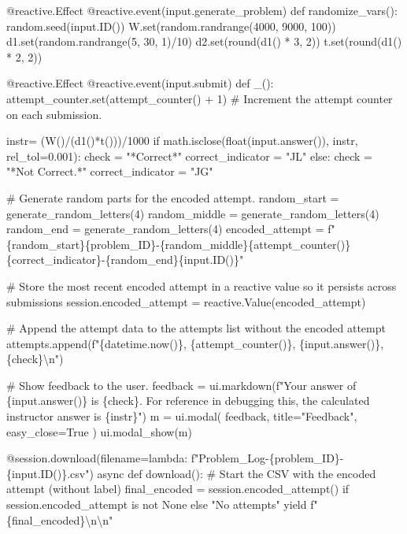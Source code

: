 \documentclass[
  letterpaper,
  DIV=11,
  numbers=noendperiod]{scrreprt}
\newenvironment{Shaded}{\begin{snugshade}}{\end{snugshade}}
\newcommand{\NormalTok}[1]{\textcolor[rgb]{0.00,0.23,0.31}{#1}}
\begin{document}
\begin{Shaded}
\begin{Highlighting}[]
\NormalTok{    @reactive.Effect}
\NormalTok{    @reactive.event(input.generate\_problem)}
\NormalTok{    def randomize\_vars():}
\NormalTok{        random.seed(input.ID())}
\NormalTok{        W.set(random.randrange(4000, 9000, 100))}
\NormalTok{        d1.set(random.randrange(5, 30, 1)/10)}
\NormalTok{        d2.set(round(d1() * 3, 2))}
\NormalTok{        t.set(round(d1() * 2, 2))}

\NormalTok{    @reactive.Effect}
\NormalTok{    @reactive.event(input.submit)}
\NormalTok{    def \_():}
\NormalTok{        attempt\_counter.set(attempt\_counter() + 1)  \# Increment the attempt counter on each submission.}
    
\NormalTok{        instr= (W()/(d1()*t()))/1000}
\NormalTok{        if math.isclose(float(input.answer()), instr, rel\_tol=0.001):}
\NormalTok{            check = "*Correct*"}
\NormalTok{            correct\_indicator = "JL"}
\NormalTok{        else:}
\NormalTok{            check = "*Not Correct.*"}
\NormalTok{            correct\_indicator = "JG"}

\NormalTok{        \# Generate random parts for the encoded attempt.}
\NormalTok{        random\_start = generate\_random\_letters(4)}
\NormalTok{        random\_middle = generate\_random\_letters(4)}
\NormalTok{        random\_end = generate\_random\_letters(4)}
\NormalTok{        encoded\_attempt = f"\{random\_start\}\{problem\_ID\}{-}\{random\_middle\}\{attempt\_counter()\}\{correct\_indicator\}{-}\{random\_end\}\{input.ID()\}"}

\NormalTok{        \# Store the most recent encoded attempt in a reactive value so it persists across submissions}
\NormalTok{        session.encoded\_attempt = reactive.Value(encoded\_attempt)}

\NormalTok{        \# Append the attempt data to the attempts list without the encoded attempt}
\NormalTok{        attempts.append(f"\{datetime.now()\}, \{attempt\_counter()\}, \{input.answer()\}, \{check\}\textbackslash{}n")}

\NormalTok{        \# Show feedback to the user.}
\NormalTok{        feedback = ui.markdown(f"Your answer of \{input.answer()\} is \{check\}. For reference in debugging this, the calculated instructor answer is \{instr\}")}
\NormalTok{        m = ui.modal(}
\NormalTok{            feedback,}
\NormalTok{            title="Feedback",}
\NormalTok{            easy\_close=True}
\NormalTok{        )}
\NormalTok{        ui.modal\_show(m)}

\NormalTok{    @session.download(filename=lambda: f"Problem\_Log{-}\{problem\_ID\}{-}\{input.ID()\}.csv")}
\NormalTok{    async def download():}
\NormalTok{        \# Start the CSV with the encoded attempt (without label)}
\NormalTok{        final\_encoded = session.encoded\_attempt() if session.encoded\_attempt is not None else "No attempts"}
\NormalTok{        yield f"\{final\_encoded\}\textbackslash{}n\textbackslash{}n"}
        

\end{Highlighting}
\end{Shaded}
\end{document}
